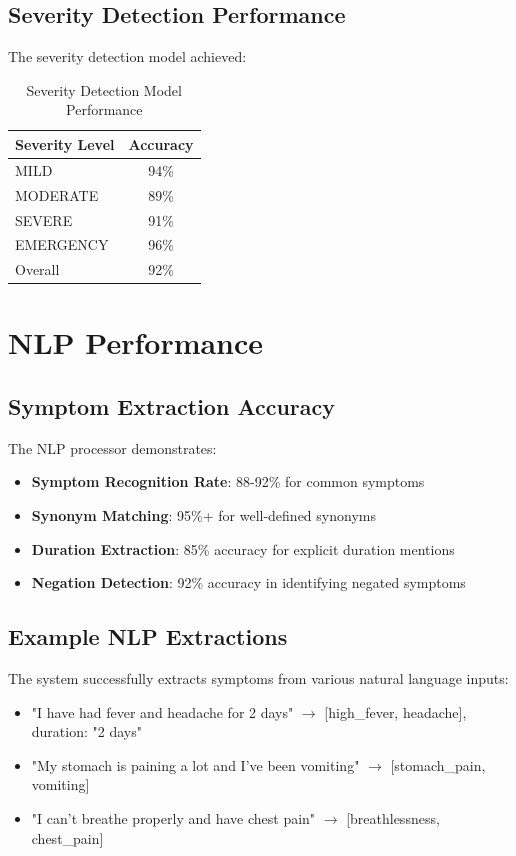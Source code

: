 \subsection{Severity Detection Performance}
The severity detection model achieved:

\begin{table}[H]
\centering
\caption{Severity Detection Model Performance}
\begin{tabular}{|l|c|}
\hline
\textbf{Severity Level} & \textbf{Accuracy} \\
\hline
MILD & 94\% \\
\hline
MODERATE & 89\% \\
\hline
SEVERE & 91\% \\
\hline
EMERGENCY & 96\% \\
\hline
Overall & 92\% \\
\hline
\end{tabular}
\end{table}

\section{NLP Performance}
\subsection{Symptom Extraction Accuracy}
The NLP processor demonstrates:

\begin{itemize}
    \item \textbf{Symptom Recognition Rate}: 88-92\% for common symptoms
    \item \textbf{Synonym Matching}: 95\%+ for well-defined synonyms
    \item \textbf{Duration Extraction}: 85\% accuracy for explicit duration mentions
    \item \textbf{Negation Detection}: 92\% accuracy in identifying negated symptoms
\end{itemize}

\subsection{Example NLP Extractions}
The system successfully extracts symptoms from various natural language inputs:

\begin{itemize}
    \item "I have had fever and headache for 2 days" $\rightarrow$ [high\_fever, headache], duration: "2 days"
    \item "My stomach is paining a lot and I've been vomiting" $\rightarrow$ [stomach\_pain, vomiting]
    \item "I can't breathe properly and have chest pain" $\rightarrow$ [breathlessness, chest\_pain]
\end{itemize}

